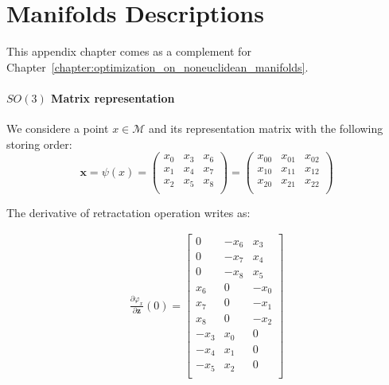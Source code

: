 

\chapter{Manifolds Descriptions}
\label{appendix:manifolds}

\graphicspath{{Appendix2-Manifolds/Figs/}}

This appendix chapter comes as a complement for Chapter~\ref{chapter:optimization_on_noneuclidean_manifolds}.

\subsubsection{$SO(3)$ Matrix representation}
\label{ssub:so(3)_matrix_representation}

We considere a point $x\in\mathcal{M}$ and its representation matrix with the following storing order:
\begin{equation}
\mathbf{x}=\psi(x)
= \begin{pmatrix}
  x_0 & x_3 & x_6 \\
  x_1 & x_4 & x_7 \\
  x_2 & x_5 & x_8 \\
\end{pmatrix}
= \begin{pmatrix}
  x_{00} & x_{01} & x_{02} \\
  x_{10} & x_{11} & x_{12} \\
  x_{20} & x_{21} & x_{22} \\
\end{pmatrix}
\end{equation}

The derivative of retractation operation writes as:

\begin{align}
\label{eq:diffRetrSO3Matrix}
  \frac{\partial \varphi_x}{\partial \mathbf{z}}(0) =
  \begin{bmatrix}
    0 & -x_6 & x_3 \\
    0 & -x_7 & x_4 \\
    0 & -x_8 & x_5 \\
    x_6 & 0 & -x_0 \\
    x_7 & 0 & -x_1 \\
    x_8 & 0 & -x_2 \\
    -x_3 & x_0 & 0 \\
    -x_4 & x_1 & 0 \\
    -x_5 & x_2 & 0 \\
  \end{bmatrix}
\end{align}

